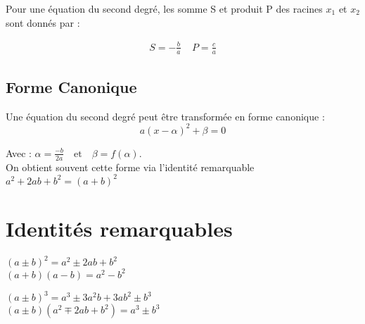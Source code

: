 \documentclass{report}
\begin{document}
    Pour une équation du second degré, les somme S et produit P des racines $x_1$ et $x_2$ sont donnés par :

    \[
    \begin{aligned}
        S = -\frac{b}{a}~~~~~
        P = \frac{c}{a}
    \end{aligned}
    \]

    \subsection{Forme Canonique}

    Une équation du second degré peut être transformée en forme canonique : \[ a(x - \alpha)^2+ \beta = 0\]

    Avec : $\alpha = \frac{-b}{2a} \quad \text{et} \quad \beta = f(\alpha)$. \\
    On obtient souvent cette forme via l'identité remarquable $a^2+2ab+b^2=(a+b)^2$


    \vfill

    \section{Identités remarquables}

    \label{IDR}

      \begin{center}
        \begin{minipage}{0.49\textwidth}
          \begin{tcolorbox}[colback=white, colframe=black, boxrule=0.5pt, width=\textwidth]
            \begin{center}
              \((a\pm b)^2 = a^2 \pm2ab + b^2\) \\
              \((a+b)(a-b) = a^2-b^2\)
            \end{center}
          \end{tcolorbox}
        \end{minipage}
        \hfill
        \begin{minipage}{0.49\textwidth}
          \begin{center}
            \begin{tcolorbox}[colback=white, colframe=black, boxrule=0.5pt, width=\textwidth]
              \((a\pm b)^3 = a^3 \pm3a^2b +3ab^2\pm b^3\) \\
              \((a\pm b)(a^2 \mp 2ab + b^2) = a^3\pm b^3\)
            \end{tcolorbox}
          \end{center}
        \end{minipage}
      \end{center}
\end{document}
